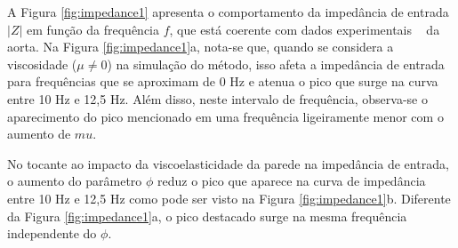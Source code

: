 \documentclass[
        english,			
        brazil			        %
        ,<...>]{abntbibufjf}
\begin{document}
A Figura \ref{fig:impedance1} apresenta o comportamento da impedância de entrada $|Z|$ em função da frequência $f$, que está coerente com dados experimentais ~\cite{Nichols2011} da aorta. Na Figura \ref{fig:impedance1}a, nota-se que, quando se considera a viscosidade ($\mu \neq 0$) na simulação do método, isso afeta a impedância de entrada para frequências que se aproximam de 0 Hz e atenua o pico que surge na curva entre 10 Hz e 12,5 Hz. Além disso, neste intervalo de frequência, observa-se o aparecimento do pico mencionado em uma frequência ligeiramente menor com o aumento de $mu$.

No tocante ao impacto da viscoelasticidade da parede na impedância de entrada, o aumento do parâmetro $\phi$ reduz o pico que aparece na curva de impedância entre 10 Hz e 12,5 Hz como pode ser visto na Figura \ref{fig:impedance1}b. Diferente da Figura \ref{fig:impedance1}a, o pico destacado surge na mesma frequência independente do $\phi$.
\end{document}
